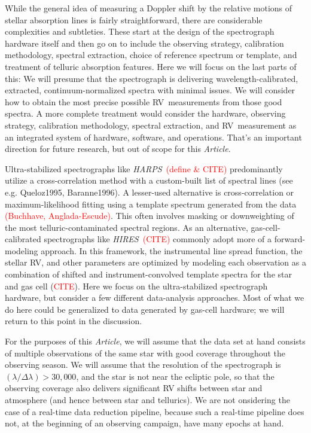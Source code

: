 \documentclass[modern]{aastex63}
\newcommand{\documentname}{\textsl{Article}}
\newcommand{\todo}[1]{\textcolor{red}{#1}}  %
\newcommand{\CITE}{\todo{CITE}}
\newcommand{\acronym}[1]{{\small{#1}}}
\newcommand{\project}[1]{\textsl{#1}}
\newcommand{\HARPS}{\project{\acronym{HARPS}}}
\newcommand{\HIRES}{\project{\acronym{HIRES}}}
\newcommand{\RV}{\acronym{RV}}
\begin{document}
While the general idea of measuring a Doppler shift by the relative
motions of stellar absorption lines is fairly straightforward, there
are considerable complexities and subtleties.
These start at the design of the spectrograph hardware itself
and then go on to include 
the observing strategy, calibration methodology, spectral extraction,
choice of reference spectrum or template, and treatment of telluric absorption
features.
Here we will focus on the last parts of this: We will presume that the
spectrograph is delivering wavelength-calibrated, extracted, continuum-normalized
spectra with minimal issues.
We will consider how to obtain the most
precise possible \RV\ measurements from those good spectra.
A more complete treatment would consider the hardware, observing strategy,
calibration methodology, spectral extraction, and \RV\ measurement as
an integrated system of hardware, software, and operations.
That's an important direction for future research, but out of scope for this \documentname.

Ultra-stabilized spectrographs like \HARPS\ \todo{(define \& \CITE)}
predominantly utilize a cross-correlation method with a custom-built
list of spectral lines (see e.g. Queloz1995, Baranne1996).
A lesser-used alternative is cross-correlation or maximum-likelihood
fitting using a template spectrum generated from the data \todo{(Buchhave,
Anglada-Escude)}.
This often involves masking or downweighting of the most
telluric-contaminated spectral regions.
As an alternative, gas-cell-calibrated spectrographs like
\HIRES\ \todo{(CITE)} commonly adopt more of a forward-modeling approach.
In this framework, the instrumental line spread function, the stellar
RV, and other parameters are optimized by modeling each observation as
a combination of shifted and instrument-convolved template spectra for
the star and gas cell (\CITE).
Here we focus on the ultra-stabilized spectrograph hardware, but consider
a few different data-analysis approaches.
Most of what we do here could be generalized to data generated by
gas-cell hardware; we will return to this point in the discussion.

For the purposes of this \documentname, we will assume that the data
set at hand consists of multiple observations of the same star with
good coverage throughout the observing season.
We will assume that the resolution of the spectrograph is $(\lambda /
\Delta\lambda) > 30,000$, and the star is not near the ecliptic pole,
so that the observing coverage also delivers significant RV shifts
between star and atmosphere (and hence between star and tellurics).
We are not onsidering the case of a real-time data reduction pipeline,
because such a real-time pipeline does not, at the beginning of an
observing campaign, have many epochs at hand.
\end{document}
